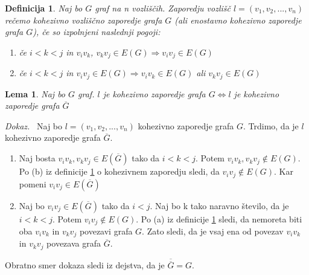 \documentclass[a4paper, 12pt]{book}
\newtheorem{definicija}{Definicija}[chapter]
\newtheorem{lema}{Lema}[chapter]
\newenvironment{dokaz}{\emph{Dokaz.}\ }{\hspace{\fill}{$\Box$}}
\begin{document}
\begin{definicija}
\label{def0}
    Naj bo $G$ graf na n vozliščih. Zaporedju vozlišč $l = (v_1, v_2, ..., v_n)$ rečemo kohezivno vozliščno zaporedje grafa $G$ (ali enostavno kohezivno zaporedje grafa $G$), če so izpolnjeni naslednji pogoji:
    \begin{enumerate}[label=(\alph*)]
        \item če $i < k < j$ in $v_iv_k$, $v_kv_j \in E(G) \Rightarrow v_iv_j \in E(G)$
        \item če $i < k < j$ in $v_iv_j \in E(G) \Rightarrow v_iv_k \in E(G)$ ali $v_kv_j \in E(G)$
    \end{enumerate}
\end{definicija}

\begin{lema}
\label{lema0}
    Naj bo $G$ graf. $l$ je kohezivno zaporedje grafa $G \Leftrightarrow l$ je kohezivno zaporedje grafa $\overline{G}$ 
\end{lema}
\begin{dokaz}
    Naj bo $l = (v_1, v_2, ..., v_n)$ kohezivno zaporedje grafa $G$. Trdimo, da je $l$ kohezivno zaporedje grafa $\overline{G}$. 
    \begin{enumerate}[label=(\alph*)]
        \item Naj bosta $v_iv_k, v_kv_j \in E(\overline{G})$ tako da $i < k < j$. Potem $v_iv_k, v_kv_j \notin E(G)$. Po (b) iz definicije \ref{def0} o kohezivnem zaporedju sledi, da $v_iv_j \notin E(G)$. Kar pomeni $v_iv_j \in E(\overline{G})$
        \item Naj bo $v_iv_j \in E(\overline{G})$ tako da $i < j$. Naj bo k tako naravno število, da je $i < k < j$. Potem $v_iv_j \notin E(G)$. Po (a) iz definicije \ref{def0} sledi, da nemoreta biti oba $v_iv_k$ in $v_kv_j$ povezavi grafa $G$. Zato sledi, da je vsaj ena od povezav $v_iv_k$ in $v_kv_j$ povezava grafa $\overline{G}$. 
    \end{enumerate}
    Obratno smer dokaza sledi iz dejstva, da je $\overline{\overline{G}} = G$.
\end{dokaz}
\end{document}
